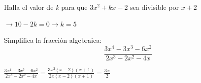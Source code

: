 \documentclass[addpoints,spanish, 12pt,a4paper]{exam}
\begin{document}
\begin{questions}



\question[1] Halla el valor de \emph{k} para que $3x^2+kx-2$ sea divisible por $x+2$
\begin{solution} $\to 10-2k=0 \to k=5 $ \end{solution}

\addpoints

%

\question[1] Simplifica la fracción algebraica: $$\frac{3 x^{4} - 3 x^{3} - 6 x^{2}}{2 x^{3} - 2 x^{2} - 4 x}$$
\begin{solution} $\frac{3 x^{4} - 3 x^{3} - 6 x^{2}}{2 x^{3} - 2 x^{2} - 4 x}=\frac{3 x^{2} \left(x - 2\right) \left(x + 1\right)}{2 x \left(x - 2\right) \left(x + 1\right)}=\frac{3 x}{2}$  \end{solution}

%




\end{questions}
\end{document}
